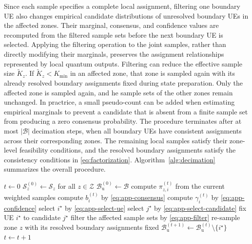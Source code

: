 \documentclass[journal]{IEEEtran}
\begin{document}
{Since each sample specifies a complete local assignment, filtering one boundary UE also changes empirical candidate distributions of
unresolved boundary UEs in the affected zones. Their marginal, consensus, and confidence values are recomputed from the filtered sample sets before the next boundary UE is selected. Applying the filtering operation to the joint samples, rather than directly modifying their marginals, preserves the assignment relationships represented by local quantum outputs.
Filtering can reduce the effective sample size $\widetilde K_z$. If $\widetilde K_z<K_{\min}$ in an affected zone, that zone is sampled again with its already resolved boundary assignments fixed during state preparation. Only the affected zone is sampled again, and he sample sets of the other zones remain unchanged. In practrice, a small pseudo-count can be added when estimating empirical marginals to prevent a candidate that is absent from a finite sample set from producing a zero consensus probability.
The procedure terminates after at most $|\mathcal B|$ decimation steps, when all boundary UEs have consistent assignments across their
corresponding zones. The remaining local samples satisfy their zone-level feasibility conditions, and the resolved boundary assignments satisfy the consistency conditions in \eqref{eq:factorization}. Algorithm~\ref{alg:decimation} summarizes the overall procedure.

\begin{algorithm}[!t]
\caption{Confidence-ordered decimation}
\label{alg:decimation}
\begin{algorithmic}[1]
\STATE $t\leftarrow0$
\STATE $\mathcal S_z^{(0)}\leftarrow\mathcal S_z$ for all
$z\in\mathcal Z$
\STATE $\mathcal B_{\mathrm u}^{(0)}\leftarrow\mathcal B$
\STATE compute $\pi_{z,i}^{(t)}$ from the current weighted samples
\STATE compute $b_i^{(t)}$ by \eqref{eq:app-consensus}
\STATE compute $\gamma_i^{(t)}$ by \eqref{eq:app-confidence}
\STATE select $i^\star$ by \eqref{eq:app-select-ue}
\STATE select $j^\star$ by \eqref{eq:app-select-candidate}
\STATE fix UE $i^\star$ to candidate $j^\star$
\STATE filter the affected sample sets by \eqref{eq:app-filter}
\STATE re-sample zone $z$ with its resolved boundary assignments fixed
\ENDIF
\STATE $\mathcal B_{\mathrm u}^{(t+1)}
\leftarrow
\mathcal B_{\mathrm u}^{(t)}\setminus\{i^\star\}$
\STATE $t\leftarrow t+1$
\ENDWHILE
\end{algorithmic}
\end{algorithm}

}
\end{document}
